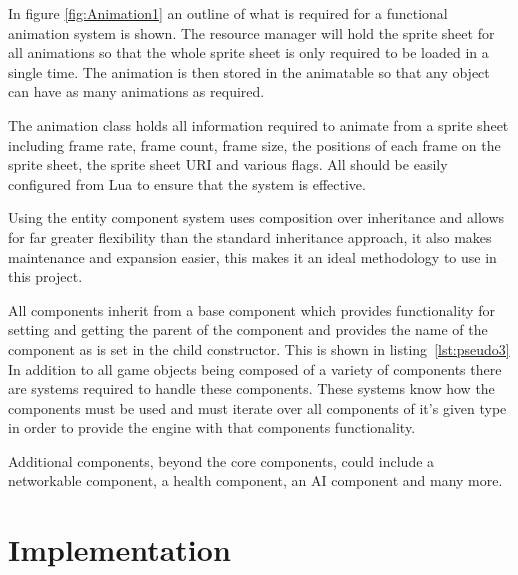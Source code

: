 \documentclass[11pt,a4paper,titlepage]{report}
\begin{document}
	In figure \ref{fig:Animation1} an outline of what is required for a functional animation system is shown. The resource manager will hold the sprite sheet for all animations so that the whole sprite sheet is only required to be loaded in a single time. The animation is then stored in the animatable so that any object can have as many animations as required.

	The animation class holds all information required to animate from a sprite sheet including frame rate, frame count, frame size, the positions of each frame on the sprite sheet, the sprite sheet URI and various flags. All should be easily configured from Lua to ensure that the system is effective.


	Using the entity component system uses composition over inheritance and allows for far greater flexibility than the standard inheritance approach, it also makes maintenance and expansion easier, this makes it an ideal methodology to use in this project.

	

	All components inherit from a base component which provides functionality for setting and getting the parent of the component and provides the name of the component as is set in the child constructor. This is shown in listing~\ref{lst:pseudo3} In addition to all game objects being composed of a variety of components there are systems required to handle these components. These systems know how the components must be used and must iterate over all components of it's given type in order to provide the engine with that components functionality.

	Additional components, beyond the core components, could include a networkable component, a health component, an AI component and many more.










\chapter{Implementation}

\end{document}
